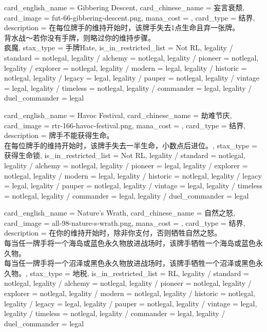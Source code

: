 \documentclass[lang = cn, color = black, 10pt]{AllThatStax}
\begin{document}
\card
{
	card_english_name = {Gibbering Descent},
	card_chinese_name = {妄言衰颓},
	card_image = fut-66-gibbering-descent.png,
	mana_cost = ,
	card_type = 结界,
	description = {在每位牌手的维持开始时，该牌手失去1点生命且弃一张牌。\\
背水战～若你没有手牌，则略过你的维持步骤。\\
疯魔},
	stax_type = 手牌Hate,
	is_in_restricted_list = Not RL,
	legality / standard = notlegal,
	legality / alchemy = notlegal,
	legality / pioneer = notlegal,
	legality / explorer = notlegal,
	legality / modern = legal,
	legality / historic = notlegal,
	legality / legacy = legal,
	legality / pauper = notlegal,
	legality / vintage = legal,
	legality / timeless = notlegal,
	legality / commander = legal,
	legality / duel_commander = legal
}

\card
{
	card_english_name = {Havoc Festival},
	card_chinese_name = {劫难节庆},
	card_image = rtr-166-havoc-festival.png,
	mana_cost = ,
	card_type = 结界,
	description = {牌手不能获得生命。\\
在每位牌手的维持开始时，该牌手失去一半生命，小数点后进位。},
	stax_type = 获得生命锁,
	is_in_restricted_list = Not RL,
	legality / standard = notlegal,
	legality / alchemy = notlegal,
	legality / pioneer = legal,
	legality / explorer = notlegal,
	legality / modern = legal,
	legality / historic = notlegal,
	legality / legacy = legal,
	legality / pauper = notlegal,
	legality / vintage = legal,
	legality / timeless = notlegal,
	legality / commander = legal,
	legality / duel_commander = legal
}

\card
{
	card_english_name = {Nature's Wrath},
	card_chinese_name = {自然之怒},
	card_image = all-98-nature-s-wrath.png,
	mana_cost = ,
	card_type = 结界,
	description = {在你的维持开始时，除非你支付，否则牺牲自然之怒。\\
每当任一牌手将一个海岛或蓝色永久物放进战场时，该牌手牺牲一个海岛或蓝色永久物。\\
每当任一牌手将一个沼泽或黑色永久物放进战场时，该牌手牺牲一个沼泽或黑色永久物。},
	stax_type = 地税,
	is_in_restricted_list = RL,
	legality / standard = notlegal,
	legality / alchemy = notlegal,
	legality / pioneer = notlegal,
	legality / explorer = notlegal,
	legality / modern = notlegal,
	legality / historic = notlegal,
	legality / legacy = legal,
	legality / pauper = notlegal,
	legality / vintage = legal,
	legality / timeless = notlegal,
	legality / commander = legal,
	legality / duel_commander = legal
}
\end{document}
